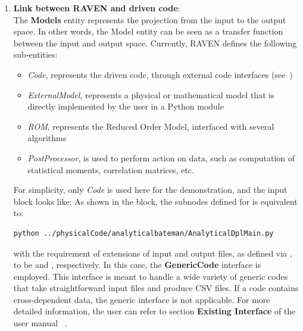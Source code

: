 \begin{enumerate}
   \item \textbf{Link between RAVEN and driven code}: 
     \\ The \textbf{Models} entity represents the projection from the input to the output space. In other words,
     the Model entity can be seen as a transfer function between the input and output space. Currently, RAVEN
     defines the following sub-entities:
     \begin{itemize}
       \item \textit{Code}, represents the driven code, through external code interfaces (see~\cite{RAVENuserManual})
       \item  \textit{ExternalModel}, represents a physical or mathematical model that is directly implemented by
         the user in a Python module
       \item \textit{ROM}, represents the Reduced Order Model, interfaced with several algorithms
       \item \textit{PostProcessor}, is used to perform action on data, such as computation of statistical moments,
         correlation matrices, etc.
     \end{itemize}
     For simplicity, only \textit{Code} is used here for the demonstration, and the input block looks like:
     As shown in the  block, the subnodes defined for  is equivalent to:
     \begin{lstlisting}[language=bash]
     python ../physicalCode/analyticalbateman/AnalyticalDplMain.py
     \end{lstlisting}
     with the requirement of extensions of input and output files, as defined via , to be 
      and , respectively. In this case, the \textbf{GenericCode} interface is employed.
     This interface is meant to handle a wide variety of generic codes that take straightforward input files and produce
     CSV files. \nb If a code contains cross-dependent data, the generic interface is not applicable. For more detailed
     information, the user can refer to section \textbf{Existing Interface} of the user manual ~\cite{RAVENuserManual}.


\end{enumerate}
